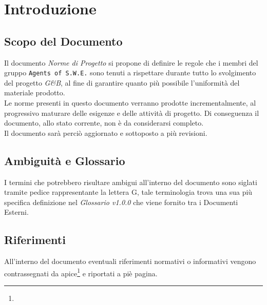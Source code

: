 \section{Introduzione}

\subsection{Scopo del Documento}
Il documento \textit{Norme di Progetto} si propone di definire le regole che i membri del gruppo \texttt{Agents of S.W.E.} sono tenuti a rispettare durante tutto lo svolgimento del progetto \textit{G\&B}, al fine di garantire quanto più possibile l'uniformità del materiale prodotto.\\
Le norme presenti in questo documento verranno prodotte incrementalmente, al progressivo maturare delle esigenze e delle attività di progetto. Di conseguenza il documento, allo stato corrente, non è da considerarsi completo.\\
Il documento sarà perciò aggiornato e sottoposto a più revisioni.

\subsection{Ambiguità e Glossario}
I termini che potrebbero risultare ambigui all'interno del documento sono siglati tramite pedice rappresentante la lettera \textmd{G}, tale terminologia trova una sua più specifica definizione nel \textit{Glossario v1.0.0} che viene fornito tra i Documenti Esterni.

\subsection{Riferimenti}
All'interno del documento eventuali riferimenti normativi o informativi vengono contrassegnati da apice\footnote{} e riportati a piè pagina.